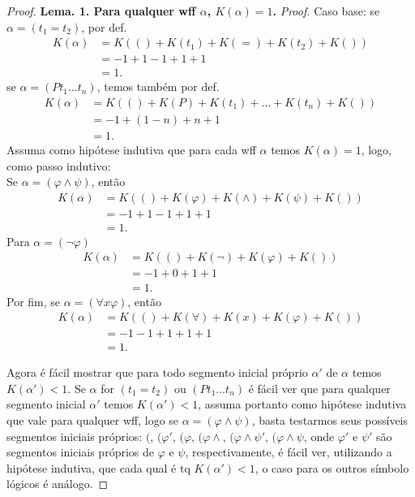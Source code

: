 \documentclass[11pt]{article}
\begin{document}
\begin{proof}
    \textbf{Lema. 1. Para qualquer wff $\alpha$, $K(\alpha)=1$.} \textit{Proof.} Caso base: se $\alpha=(t_1=t_2)$, por def.
    \begin{align*}
        K(\alpha) & = K(() + K(t_1) + K(=) + K(t_2) + K())\\
        & = -1 + 1 - 1 + 1 + 1\\
        & = 1.
    \end{align*}
    se $\alpha=(Pt_1\dots t_n)$, temos também por def.
    \begin{align*}
        K(\alpha) & = K(() + K(P) + K(t_1) + \dots + K(t_n) + K())\\
        & = -1 + (1 - n) + n + 1\\
        & = 1.
    \end{align*}
    Assuma como hipótese indutiva que para cada wff $\alpha$ temos $K(\alpha)=1$, logo, como passo indutivo:\\
    Se $\alpha=(\varphi\wedge\psi)$, então
    \begin{align*}
        K(\alpha) & = K(() + K(\varphi) + K(\wedge) + K(\psi) + K())\\
        & = -1 + 1 - 1 + 1 + 1\\
        & = 1.
    \end{align*}
    Para $\alpha=(\neg\varphi)$
    \begin{align*}
        K(\alpha) & = K(() + K(\neg) + K(\varphi) + K())\\
        & = -1 + 0 + 1 + 1\\
        & = 1.
    \end{align*}
    Por fim, se $\alpha=(\forall x\varphi)$, então
    \begin{align*}
        K(\alpha) & = K(() + K(\forall) + K(x) + K(\varphi) + K())\\
        & = -1 - 1 + 1 + 1 + 1\\
        & = 1.
    \end{align*}

    Agora é fácil mostrar que para todo segmento inicial próprio $\alpha'$ de $\alpha$ temos $K(\alpha')<1$. Se $\alpha$ for $(t_1=t_2)$ ou $(Pt_1\dots t_n)$ é fácil ver que para qualquer segmento inicial $\alpha'$ temos $K(\alpha')<1$, assuma portanto como hipótese indutiva que vale para qualquer wff, logo se $\alpha=(\varphi\wedge\psi)$, basta testarmos seus possíveis segmentos iniciais próprios: $($, $(\varphi'$, $(\varphi$, $(\varphi\wedge$, $(\varphi\wedge\psi'$, $(\varphi\wedge\psi$, onde $\varphi'$ e $\psi'$ são segmentos iniciais próprios de $\varphi$ e $\psi$, respectivamente, é fácil ver, utilizando a hipótese indutiva, que cada qual é tq $K(\alpha')<1$, o caso para os outros símbolo lógicos é análogo. 
\end{proof}
\end{document}
